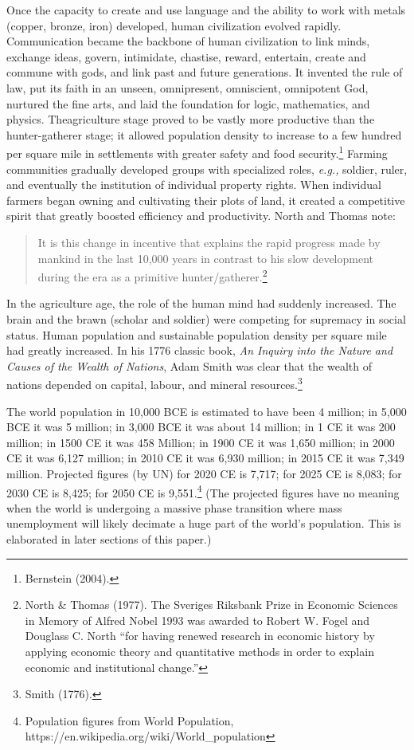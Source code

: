 \begin{multicols}{2}
Once the capacity to create and use language and the ability to work with metals (copper, bronze, iron) developed, human civilization evolved rapidly. Communication became the backbone of human civilization to link minds, exchange ideas, govern, intimidate, chastise, reward, entertain, create and commune with gods, and link past and future generations. It invented the rule of law, put its faith in an unseen, omnipresent, omniscient, omnipotent God, nurtured the fine arts, and laid the foundation for logic, mathematics, and physics. The\break agriculture stage proved to be vastly more productive than the hunter-gatherer stage; it allowed population density to increase to a few hundred per square mile in settlements with greater safety and food security.\footnote{Bernstein (2004).} Farming communities gradually developed groups with specialized roles, \textit{e.g.,} soldier, ruler, and eventually the institution of individual property rights. When individual farmers began owning and cultivating their plots of land, it created a competitive spirit that greatly boosted efficiency and productivity. North and Thomas note: 
\begin{quote}
It is this change in incentive that explains the rapid progress made by mankind in the last 10,000 years in contrast to his slow development during the era as a primitive hunter/gatherer.\footnote{North \& Thomas (1977). The Sveriges Riksbank Prize in Economic Sciences in Memory of Alfred Nobel 1993 was awarded to Robert W. Fogel and Douglass C. North “for having renewed research in economic history by applying economic theory and quantitative methods in order to explain economic and institutional change.”}
\end{quote}

In the agriculture age, the role of the human mind had suddenly increased. The brain and the brawn (scholar and soldier) were competing for supremacy in social status. Human population and sustainable population density per square mile had greatly increased. In his 1776 classic book, \textit{An Inquiry into the Nature and Causes of the Wealth of Nations}, Adam Smith was clear that the wealth of nations depended on capital, labour, and mineral resources.\footnote{Smith (1776).}

The world population in 10,000 BCE is estimated to have been 4 million; in 5,000 BCE it was 5 million; in 3,000 BCE it was about 14 million; in 1 CE it was 200 million; in 1500 CE it was 458 Million; in 1900 CE it was 1,650 million; in 2000 CE it was 6,127 million; in 2010 CE it was 6,930 million; in 2015 CE it was 7,349 million. Projected figures (by UN) for 2020 CE is 7,717; for 2025 CE is 8,083; for 2030 CE is 8,425; for 2050 CE is 9,551.\footnote{Population figures from World Population, https://en.wikipedia.org/wiki/World\_population}  (The projected figures have no meaning when the world is undergoing a massive phase transition where mass unemployment will likely decimate a huge part of the world's population. This is elaborated in later sections of this paper.)


\end{multicols}
